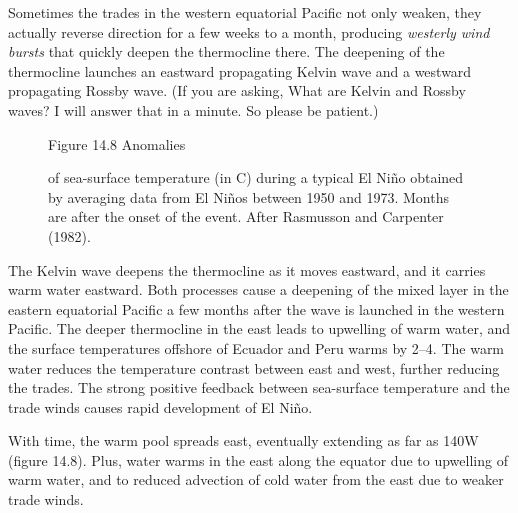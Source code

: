 Sometimes the trades in the western equatorial Pacific not only weaken, they actually reverse direction for a few weeks to a month, producing \textit{westerly wind bursts} that quickly deepen the thermocline there. The deepening of the thermocline launches an eastward propagating Kelvin wave and a westward propagating Rossby wave. (If you are asking, What are Kelvin and Rossby waves? I will answer that in a minute. So please be patient.)


\begin{figure}[p!]
\footnotesize
Figure 14.8 Anomalies \rule{0pt}{3ex}of sea-surface
temperature (in \degrees C) during a typical El Ni\~{n}o obtained by averaging data from El Ni\~{n}os between 1950 and 1973. Months are after the onset of the event. After Rasmusson and Carpenter (1982).
\label{fig:elninoanomalies}
\vspace{-3ex}
\end{figure}

The Kelvin wave deepens the thermocline as it moves eastward, and it carries warm water eastward. Both processes cause a deepening of the mixed layer in the eastern equatorial Pacific a few months after the wave is launched in the western Pacific. The deeper thermocline in the east leads to upwelling of warm water, and the surface temperatures offshore of Ecuador and Peru warms by 2--4\degrees. The warm water reduces the temperature contrast between east and west, further reducing the trades. The strong positive feedback between sea-surface temperature and the trade winds causes rapid development of El Ni\~{n}o. 

With time, the warm pool spreads east, eventually extending as far as 140\degrees W (figure 14.8). Plus, water warms in the east along the equator due to upwelling of warm water, and to reduced advection of cold water from the east due to weaker trade winds.

